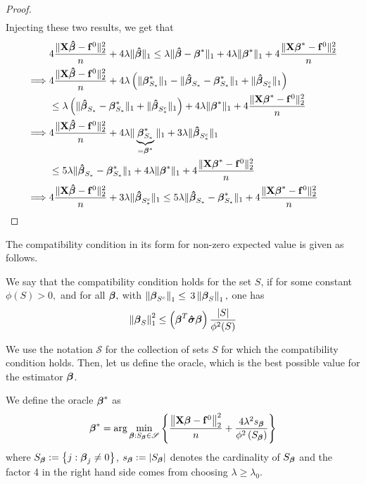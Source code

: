 \begin{proof}
\begin{align*}
    \end{align*}
    Injecting these two results, we get that
    \begin{align*}
                 & 4 \frac{\| \mathbf{X} \boldsymbol{\hat{\beta}} - \mathbf{f}^0 \|_{2}^{2}}{n} + 4 \lambda\| \boldsymbol{\hat{\beta}} \|_{1} \leq \lambda \| \boldsymbol{\hat{\beta}} - \boldsymbol{\beta}^* \|_{1} + 4 \lambda \| \boldsymbol{\beta}^*\|_{1} + 4\frac{\|\mathbf{X} \boldsymbol{\beta}^* - \mathbf{f}^0\|_{2}^{2}}{n} \\
        \implies &
        4 \frac{\| \mathbf{X} \boldsymbol{\hat{\beta}} - \mathbf{f}^0 \|_{2}^{2}}{n} + 4 \lambda \left( \|\boldsymbol{\beta}_{S_{*}}^{*} \|_{1} - \|\boldsymbol{\hat{\beta}}_{S_{*}}-\boldsymbol{\beta}_{S_{*}}^{*} \|_{1}+ \|\boldsymbol{\hat{\beta}}_{S_{*}^{c}} \|_{1} \right)                                \\
                 & \leq \lambda \left( \| \boldsymbol{\hat{\beta}}_{S_{*}}-\boldsymbol{\beta}_{S_{*}}^{*} \|_{1} + \|\boldsymbol{\hat{\beta}}_{S_{*}^{c}} \|_{1} \right) + 4 \lambda \| \boldsymbol{\beta}^*\|_{1} + 4\frac{\|\mathbf{X} \boldsymbol{\beta}^* - \mathbf{f}^0\|_{2}^{2}}{n}                    \\
        \implies &
        4 \frac{\| \mathbf{X} \boldsymbol{\hat{\beta}} - \mathbf{f}^0 \|_{2}^{2}}{n} + 4 \lambda \| \underbrace{\boldsymbol{\beta}_{S_{*}}^{*}}_{= \boldsymbol{\beta}^{*}} \|_{1} + 3 \lambda\|\boldsymbol{\hat{\beta}}_{S_{*}^{c}} \|_{1}                                                      \\
                 & \leq 5 \lambda \| \boldsymbol{\hat{\beta}}_{S_{*}}-\boldsymbol{\beta}_{S_{*}}^{*} \|_{1} + 4 \lambda \| \boldsymbol{\beta}^*\|_{1} + 4\frac{\|\mathbf{X} \boldsymbol{\beta}^* - \mathbf{f}^0\|_{2}^{2}}{n}                                                                \\
        \implies &
        4 \frac{\| \mathbf{X} \boldsymbol{\hat{\beta}} - \mathbf{f}^0 \|_{2}^{2}}{n} + 3 \lambda\|\boldsymbol{\hat{\beta}}_{S_{*}^{c}} \|_{1} \leq 5 \lambda \| \boldsymbol{\hat{\beta}}_{S_{*}}-\boldsymbol{\beta}_{S_{*}}^{*} \|_{1} + 4\frac{\|\mathbf{X} \boldsymbol{\beta}^* - \mathbf{f}^0\|_{2}^{2}}{n}           \\
    \end{align*}
\end{proof}
The compatibility condition in its form for non-zero expected value is given as follows.
\begin{definition}
    We say that the compatibility condition holds for the set $S$, if for some constant $\phi(S)>0,$ and for all $\boldsymbol{\beta},$ with $\left\|\boldsymbol{\beta}_{S^{c}}\right\|_{1} \leq$ $3\left\|\boldsymbol{\beta}_{S}\right\|_{1},$ one has
    \[
        \left\|\boldsymbol{\beta}_{S}\right\|_{1}^{2} \leq\left(\boldsymbol{\beta}^{T} \boldsymbol{\hat{\sigma}} \boldsymbol{\beta}\right)\frac{|S|}{\phi^{2}(S)}
    \]
\end{definition}
We use the notation $\mathscr{S}$ for the collection of sets $S$ for which the compatibility condition holds. Then, let us define the oracle, which is the best possible value for the estimator \(\boldsymbol{\beta}\).
\begin{definition}
    We define the oracle $\boldsymbol{\beta}^{*}$ as
    \[
        \boldsymbol{\beta}^{*} = \arg \min_{\boldsymbol{\beta}: S_{\boldsymbol{\beta}} \in \mathscr{S}} \left\{ \frac{ \left\| \mathbf{X} \boldsymbol{\beta} - \mathbf{f}^{0} \right\|_{2}^{2}}{n} + \frac{4 \lambda^{2} s_{\boldsymbol{\beta}}}{\phi^{2}\left(S_{\boldsymbol{\beta}}\right)}\right\}
    \]
    where $S_{\boldsymbol{\beta}}:=\left\{j: \boldsymbol{\beta}_{j} \neq 0\right\}$, $s_{\boldsymbol{\beta}}:=\left|S_{\boldsymbol{\beta}}\right|$ denotes the cardinality of $S_{\boldsymbol{\beta}}$ and the factor 4 in the right hand side comes from choosing $\lambda \geq \lambda_0$.
\end{definition}

